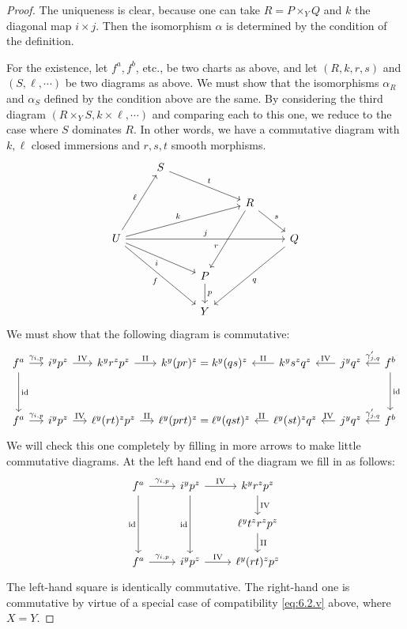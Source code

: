 \begin{proof}
The uniqueness is clear, because one can take $R = P\times_{Y} Q$ and $k$ the diagonal map $i\times j$. Then the isomorphism $\alpha$ is determined by the condition of the definition.

For the existence, let $f^{a},f^{b}$, etc., be two charts as above, and let $(R,k,r,s)$ and $(S,\ell,\cdots)$ be two diagrams as above. We must show that the isomorphisms $\alpha_R$ and $\alpha_S$ defined by the condition above are the same. By considering the third diagram $(R\times_Y S, k\times\ell,\cdots)$ and comparing each to this one, we reduce to the case where $S$ dominates $R$. In other words, we have a commutative diagram with $k,\ell$ closed immersions and $r,s,t$ smooth morphisms.
\[
\begin{tikzcd}
	& S \arrow[rrd, "t"] &&& \\
	&&& R \arrow[rd, "s"] \arrow[ldd, "r"',pos=0.7] & \\
	U \arrow[ruu, "\ell"]
	\arrow[rrru, "k"]
	\arrow[rrrr, "j"]
	\arrow[rrd, "i"']
	\arrow[ddrr, "f"']
	&&&& Q \arrow[ddll, "q"] \\
	&& P \arrow[d, "p"] && \\
	&& Y &&
\end{tikzcd}
\]
We must show that the following diagram is commutative:
\[
\begin{tikzcd}[row sep=1.2cm, column sep=0.45cm]
	f^a \arrow[r, "\gamma_{i,p}"] \arrow[d, "\mathrm{id}"] &
	i^y p^z \arrow[r, "\mathrm{IV}"] &
	k^y r^z p^z \arrow[r, "\mathrm{II}"] &
	k^y(pr)^z = k^y(qs)^z &
	k^y s^z q^z \arrow[l, "\mathrm{II}"'] &
	j^y q^z \arrow[l, "\mathrm{IV}"'] &
	f^b \arrow[l, "\gamma'_{j,q}"'] \arrow[d, "\mathrm{id}"] \\
	f^a \arrow[r, "\gamma_{i,p}"] &
	i^y p^z \arrow[r, "\mathrm{IV}"] &
	\ell^y(rt)^z p^z \arrow[r, "\mathrm{II}"] &
	\ell^y(prt)^z = \ell^y(qst)^z &
	\ell^y(st)^z q^z \arrow[l, "\mathrm{II}"'] &
	j^y q^z \arrow[l, "\mathrm{IV}"'] &
	f^b \arrow[l, "\gamma'_{j,q}"']
\end{tikzcd}
\]
We will check this one completely by filling in more arrows to make little commutative diagrams. At the left hand end of the diagram we fill in as follows:
\[
\begin{tikzcd}
f^{a} \ar[r,"\gamma_{i,p}"] \ar[dd,"\id"'] & i^{y}p^{z} \ar[r,"\mathrm{IV}"] \ar[dd,"\id"'] & k^{y}r^{z}p^{z} \ar[d,"\mathrm{IV}"] \\
&&\ell^{y}t^{z}r^{z}p^{z}\ar[d,"\mathrm{II}"]\\
f^{a} \ar[r,"\gamma_{i,p}"] & i^{y}p^{z} \ar[r,"\mathrm{IV}"] & \ell^{y}(rt)^{z}p^{z}
\end{tikzcd}
\]
The left-hand square is identically commutative. The right-hand one is commutative by virtue of a special case of compatibility \eqref{eq:6.2.v} above, where $X=Y$.


\end{proof}
